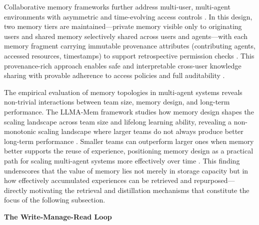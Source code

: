 \documentclass[11pt]{article}
\begin{document}
Collaborative memory frameworks further address multi-user, multi-agent environments with asymmetric and time-evolving access controls \cite{ref126}. In this design, two memory tiers are maintained---private memory visible only to originating users and shared memory selectively shared across users and agents---with each memory fragment carrying immutable provenance attributes (contributing agents, accessed resources, timestamps) to support retrospective permission checks \cite{ref126}. This provenance-rich approach enables safe and interpretable cross-user knowledge sharing with provable adherence to access policies and full auditability \cite{ref126}.

The empirical evaluation of memory topologies in multi-agent systems reveals non-trivial interactions between team size, memory design, and long-term performance. The LLMA-Mem framework studies how memory design shapes the scaling landscape across team size and lifelong learning ability, revealing a non-monotonic scaling landscape where larger teams do not always produce better long-term performance \cite{ref127}. Smaller teams can outperform larger ones when memory better supports the reuse of experience, positioning memory design as a practical path for scaling multi-agent systems more effectively over time \cite{ref127}. This finding underscores that the value of memory lies not merely in storage capacity but in how effectively accumulated experiences can be retrieved and repurposed---directly motivating the retrieval and distillation mechanisms that constitute the focus of the following subsection.

\textbf{The Write-Manage-Read Loop}
\end{document}
